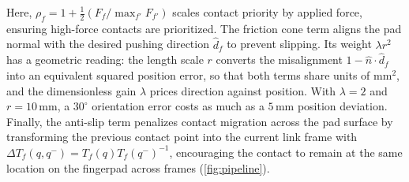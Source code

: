 Here, $\rho_f = 1 + \frac{1}{2} (F_f / \max_{f'} F_{f'})$ scales contact priority by applied force, ensuring high-force contacts are prioritized. The friction cone term aligns the pad normal with the desired pushing direction $\hat{d}_f$ to prevent slipping. Its weight $\lambda r^2$ has a geometric reading: the length scale $r$ converts the misalignment $1 - \hat{n} \cdot \hat{d}_f$ into an equivalent squared position error, so that both terms share units of mm$^2$, and the dimensionless gain $\lambda$ prices direction against position. With $\lambda = 2$ and $r = 10\,\text{mm}$, a $30^\circ$ orientation error costs as much as a $5\,\text{mm}$ position deviation. Finally, the anti-slip term penalizes contact migration across the pad surface by transforming the previous contact point into the current link frame with $\Delta T_f(q,q^{-}) = T_f(q)T_f(q^{-})^{-1}$, encouraging the contact to remain at the same location on the fingerpad across frames (\cref{fig:pipeline}).




